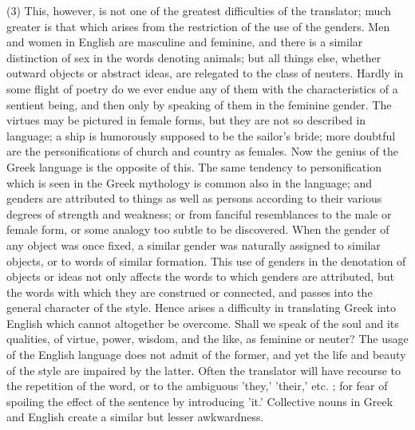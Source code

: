 \documentclass[11pt,letter]{article}
\begin{document}
\par  (3) This, however, is not one of the greatest difficulties of the translator; much greater is that which arises from the restriction of the use of the genders. Men and women in English are masculine and feminine, and there is a similar distinction of sex in the words denoting animals; but all things else, whether outward objects or abstract ideas, are relegated to the class of neuters. Hardly in some flight of poetry do we ever endue any of them with the characteristics of a sentient being, and then only by speaking of them in the feminine gender. The virtues may be pictured in female forms, but they are not so described in language; a ship is humorously supposed to be the sailor's bride; more doubtful are the personifications of church and country as females. Now the genius of the Greek language is the opposite of this. The same tendency to personification which is seen in the Greek mythology is common also in the language; and genders are attributed to things as well as persons according to their various degrees of strength and weakness; or from fanciful resemblances to the male or female form, or some analogy too subtle to be discovered. When the gender of any object was once fixed, a similar gender was naturally assigned to similar objects, or to words of similar formation. This use of genders in the denotation of objects or ideas not only affects the words to which genders are attributed, but the words with which they are construed or connected, and passes into the general character of the style. Hence arises a difficulty in translating Greek into English which cannot altogether be overcome. Shall we speak of the soul and its qualities, of virtue, power, wisdom, and the like, as feminine or neuter? The usage of the English language does not admit of the former, and yet the life and beauty of the style are impaired by the latter. Often the translator will have recourse to the repetition of the word, or to the ambiguous 'they,' 'their,' etc. ; for fear of spoiling the effect of the sentence by introducing 'it.' Collective nouns in Greek and English create a similar but lesser awkwardness.
\end{document}
